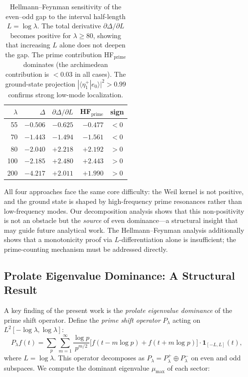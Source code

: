 \documentclass[12pt,a4paper]{article}
\theoremstyle{definition}
\theoremstyle{remark}
\begin{document}
\begin{table}[h]
\centering
\renewcommand{\arraystretch}{1.15}
\begin{tabular}{r|r|r|r|l}
$\lambda$ & $\Delta$ & $\partial\Delta/\partial L$ & HF$_{\mathrm{prime}}$ & sign \\\hline
55  & $-0.506$ & $-0.625$ & $-0.477$ & $<0$ \\
70  & $-1.443$ & $-1.494$ & $-1.561$ & $<0$ \\
80  & $-2.040$ & $+2.218$ & $+2.192$ & $>0$ \\
100 & $-2.185$ & $+2.480$ & $+2.443$ & $>0$ \\
200 & $-4.217$ & $+2.011$ & $+1.990$ & $>0$ \\
\end{tabular}
\caption{Hellmann--Feynman sensitivity of the even--odd gap to the interval half-length $L = \log\lambda$. The total derivative $\partial\Delta/\partial L$ becomes positive for $\lambda \geq 80$, showing that increasing $L$ alone does not deepen the gap. The prime contribution HF$_{\mathrm{prime}}$ dominates (the archimedean contribution is $< 0.03$ in all cases). The ground-state projection $|\langle \eta^+_1 | e_0 \rangle|^2 > 0.99$ confirms strong low-mode localization.}
\label{tab:hf-results}
\end{table}

All four approaches face the same core difficulty: the Weil kernel is not positive, and the ground state is shaped by high-frequency prime resonances rather than low-frequency modes. Our decomposition analysis shows that this non-positivity is not an obstacle but the \emph{source} of even dominance---a structural insight that may guide future analytical work. The Hellmann--Feynman analysis additionally shows that a monotonicity proof via $L$-differentiation alone is insufficient; the prime-counting mechanism must be addressed directly.

\subsection{Prolate Eigenvalue Dominance: A Structural Result}

A key finding of the present work is the \emph{prolate eigenvalue dominance} of the prime shift operator. Define the \emph{prime shift operator} $P_\lambda$ acting on $L^2[-\log\lambda, \log\lambda]$:
\[ P_\lambda f(t) = \sum_p \sum_{m=1}^\infty \frac{\log p}{p^{m/2}} \bigl[f(t - m\log p) + f(t + m\log p)\bigr] \cdot \mathbf{1}_{[-L,L]}(t), \]
where $L = \log\lambda$. This operator decomposes as $P_\lambda = P_\lambda^+ \oplus P_\lambda^-$ on even and odd subspaces. We compute the dominant eigenvalue $\mu_{\max}$ of each sector:
\end{document}
